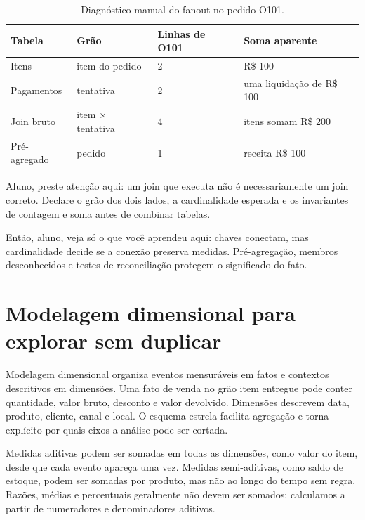 \begin{table}[htbp]
\centering
\small
\caption{Diagnóstico manual do fanout no pedido O101.}
\label{tab:fanout}
\begin{tabularx}{0.94\textwidth}{@{}p{2.7cm}p{2.4cm}YY@{}}
\toprule
\textbf{Tabela} & \textbf{Grão} & \textbf{Linhas de O101} & \textbf{Soma aparente} \\
\midrule
Itens & item do pedido & 2 & R\$ 100 \\
Pagamentos & tentativa & 2 & uma liquidação de R\$ 100 \\
Join bruto & item $\times$ tentativa & 4 & itens somam R\$ 200 \\
Pré-agregado & pedido & 1 & receita R\$ 100 \\
\bottomrule
\end{tabularx}
\end{table}

\begin{GuidedBox}
Aluno, preste atenção aqui: um join que executa não é necessariamente um join correto. Declare o grão dos dois lados, a cardinalidade esperada e os invariantes de contagem e soma antes de combinar tabelas.
\end{GuidedBox}

\begin{SummaryBox}
Então, aluno, veja só o que você aprendeu aqui: chaves conectam, mas cardinalidade decide se a conexão preserva medidas. Pré-agregação, membros desconhecidos e testes de reconciliação protegem o significado do fato.
\end{SummaryBox}

\section{Modelagem dimensional para explorar sem duplicar}

Modelagem dimensional organiza eventos mensuráveis em fatos e contextos descritivos em dimensões. Uma fato de venda no grão item entregue pode conter quantidade, valor bruto, desconto e valor devolvido. Dimensões descrevem data, produto, cliente, canal e local. O esquema estrela facilita agregação e torna explícito por quais eixos a análise pode ser cortada.

Medidas aditivas podem ser somadas em todas as dimensões, como valor do item, desde que cada evento apareça uma vez. Medidas semi-aditivas, como saldo de estoque, podem ser somadas por produto, mas não ao longo do tempo sem regra. Razões, médias e percentuais geralmente não devem ser somados; calculamos a partir de numeradores e denominadores aditivos.

